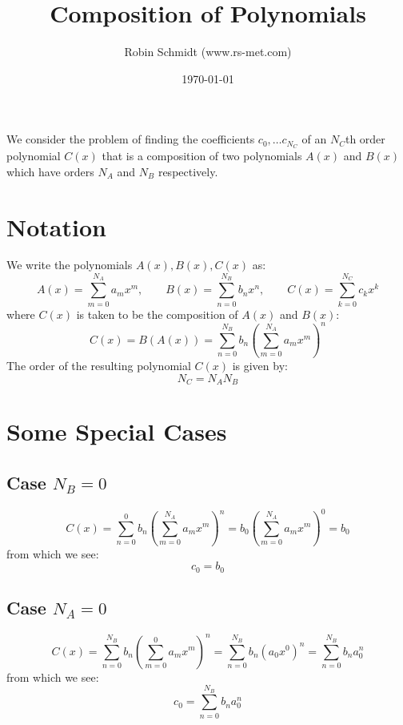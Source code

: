 \title{Composition of Polynomials}
\author{Robin Schmidt (www.rs-met.com)}
\date{\today}
\maketitle

We consider the problem of finding the coefficients $c_0, \ldots c_{N_C}$ of an $N_C$th order polynomial $C(x)$ that is a composition of two polynomials $A(x)$ and $B(x)$ which have orders $N_A$ and $N_B$ respectively. 

\section{Notation}
We write the polynomials $A(x), B(x), C(x)$ as:
\begin{equation}
  A(x) = \sum_{m=0}^{N_A} a_m x^m, \qquad
  B(x) = \sum_{n=0}^{N_B} b_n x^n, \qquad
  C(x) = \sum_{k=0}^{N_C} c_k x^k
\end{equation}
where $C(x)$ is taken to be the composition of $A(x)$ and $B(x)$:
\begin{equation}
  C(x) = B \left( A(x) \right) = \sum_{n=0}^{N_B} b_n \left( \sum_{m=0}^{N_A} a_m x^m \right)^n
\end{equation}
The order of the resulting polynomial $C(x)$ is given by: 
\begin{equation}
 N_C = N_A N_B
\end{equation}

\section{Some Special Cases}

\subsection{Case $N_B = 0$}
\begin{equation}
  C(x) = \sum_{n=0}^{0} b_n \left( \sum_{m=0}^{N_A} a_m x^m \right)^n
       =                b_0 \left( \sum_{m=0}^{N_A} a_m x^m \right)^0
       = b_0
\end{equation}
from which we see:
\begin{equation}
  c_0 = b_0
\end{equation}

\subsection{Case $N_A = 0$}
\begin{equation}
  C(x) = \sum_{n=0}^{N_B} b_n \left( \sum_{m=0}^{0} a_m x^m \right)^n
       = \sum_{n=0}^{N_B} b_n \left( a_0 x^0 \right)^n
       = \sum_{n=0}^{N_B} b_n a_0^n
\end{equation}
from which we see:
\begin{equation}
  c_0 = \sum_{n=0}^{N_B} b_n a_0^n
\end{equation}

